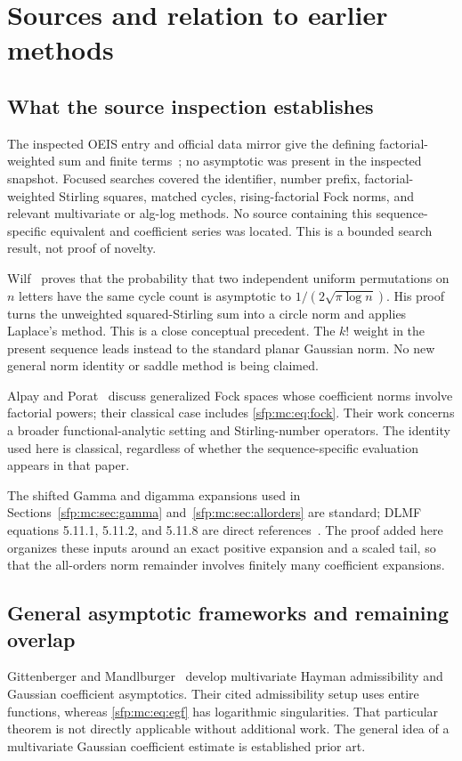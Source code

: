 \documentclass[11pt,letterpaper]{article}
\numberwithin{equation}{section}
\theoremstyle{definition}\newtheorem{definition}[theorem]{Definition}
\theoremstyle{remark}\newtheorem{remark}[theorem]{Remark}
\begin{document}
\section{Sources and relation to earlier methods}\label{sfp:mc:sec:sources}

\subsection{What the source inspection establishes}
The inspected OEIS entry and official data mirror give the
defining factorial-weighted sum and finite terms~\cite{oeis};
no asymptotic was present in the inspected snapshot. Focused
searches covered the identifier, number prefix, factorial-weighted
Stirling squares, matched cycles, rising-factorial Fock norms,
and relevant multivariate or alg-log methods. No source containing
this sequence-specific equivalent and coefficient series was
located. This is a bounded search result, not proof of novelty.

Wilf~\cite{wilf} proves that the probability that two independent
uniform permutations on $n$ letters have the same cycle count is
asymptotic to $1/(2\sqrt{\pi\log n})$. His proof turns the
unweighted squared-Stirling sum into a circle norm and applies
Laplace's method. This is a close conceptual precedent. The $k!$
weight in the present sequence leads instead to the standard
planar Gaussian norm. No new general norm identity or saddle
method is being claimed.

Alpay and Porat~\cite{alpayporat} discuss generalized Fock spaces
whose coefficient norms involve factorial powers; their classical
case includes \eqref{sfp:mc:eq:fock}. Their work concerns a broader
functional-analytic setting and Stirling-number operators. The
identity used here is classical, regardless of whether the
sequence-specific evaluation appears in that paper.

The shifted Gamma and digamma expansions used in
Sections~\ref{sfp:mc:sec:gamma} and~\ref{sfp:mc:sec:allorders} are standard;
DLMF equations 5.11.1, 5.11.2, and 5.11.8 are direct
references~\cite{dlmf-mc}. The proof added here organizes these
inputs around an exact positive expansion and a scaled tail,
so that the all-orders norm remainder involves finitely many
coefficient expansions.

\subsection{General asymptotic frameworks and remaining overlap}
Gittenberger and Mandlburger~\cite{gittenberger} develop
multivariate Hayman admissibility and Gaussian coefficient
asymptotics. Their cited admissibility setup uses entire
functions, whereas \eqref{sfp:mc:eq:egf} has logarithmic singularities.
That particular theorem is not directly applicable without
additional work. The general idea of a multivariate Gaussian
coefficient estimate is established prior art.
\end{document}
